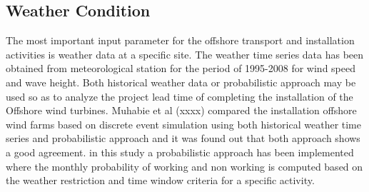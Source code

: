\subsection{Weather Condition}

The most important input parameter for the offshore transport and installation activities is weather data at a specific site. The weather time series data has been obtained from meteorological station for the period of 1995-2008 for wind speed and wave height. Both historical weather data or probabilistic approach may be used so as to  analyze the project lead time of completing the installation of the Offshore wind turbines. Muhabie et al (xxxx) compared the installation offshore wind farms based on discrete event simulation using both historical weather time series and probabilistic approach  and it was found out that both approach shows a good agreement. in this study a probabilistic approach has been implemented where the monthly probability of working and non working is computed based on the weather restriction and time window criteria for a specific activity. 